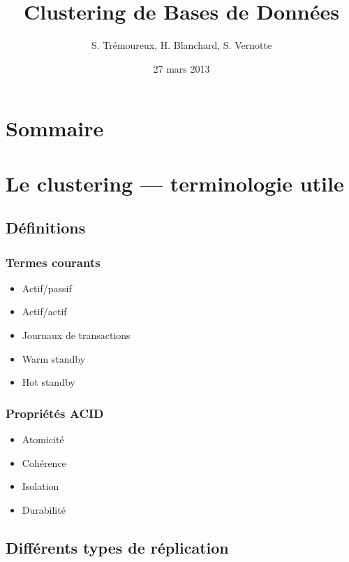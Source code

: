 \documentclass[utf8]{beamer}
\title{Clustering de Bases de Données}
\author{S. Trémoureux, H. Blanchard, S. Vernotte}
\institute{IUT Nancy-Chalemagne}
\date{27 mars 2013}
\begin{document}
\begin{frame}
  \titlepage
\end{frame}

\section*{Sommaire}
\begin{frame}
  \tableofcontents
\end{frame}      

\section{Le clustering — terminologie utile}

\subsection{Définitions}

\begin{frame}
  \frametitle{Termes courants}

  \begin{itemize}
  \item Actif/passif
  \item Actif/actif
  \item Journaux de transactions
  \item Warm standby
  \item Hot standby  
  \end{itemize}
\end{frame}

\begin{frame}
  \frametitle{Propriétés ACID}

  \begin{itemize}
  \item Atomicité
  \item Cohérence
  \item Isolation
  \item Durabilité
  \end{itemize}
\end{frame}

\subsection{Différents types de réplication}
\end{document}

